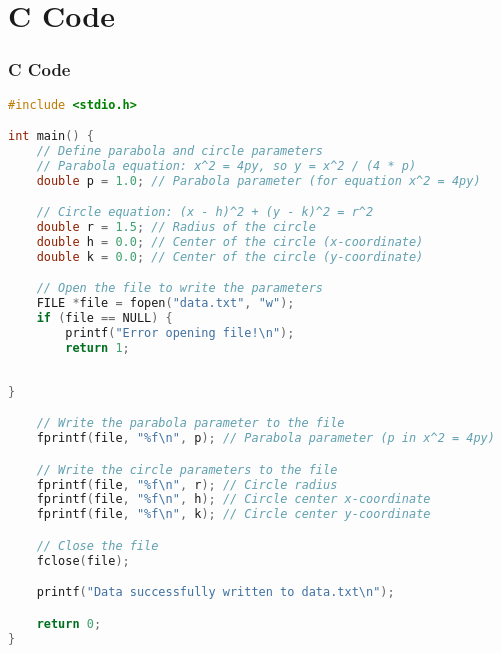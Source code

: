 \documentclass{beamer}
\theoremstyle{remark}
\numberwithin{equation}{section}
\begin{document}
\section{C Code}
\begin{frame}[fragile]
\frametitle{C Code }
\begin{lstlisting}[language=C]
#include <stdio.h>

int main() {
    // Define parabola and circle parameters
    // Parabola equation: x^2 = 4py, so y = x^2 / (4 * p)
    double p = 1.0; // Parabola parameter (for equation x^2 = 4py)

    // Circle equation: (x - h)^2 + (y - k)^2 = r^2
    double r = 1.5; // Radius of the circle
    double h = 0.0; // Center of the circle (x-coordinate)
    double k = 0.0; // Center of the circle (y-coordinate)

    // Open the file to write the parameters
    FILE *file = fopen("data.txt", "w");
    if (file == NULL) {
        printf("Error opening file!\n");
        return 1;
    
\end{lstlisting}
\end{frame}

\begin{frame}[fragile]
\begin{lstlisting}[language=C]
}

    // Write the parabola parameter to the file
    fprintf(file, "%f\n", p); // Parabola parameter (p in x^2 = 4py)

    // Write the circle parameters to the file
    fprintf(file, "%f\n", r); // Circle radius
    fprintf(file, "%f\n", h); // Circle center x-coordinate
    fprintf(file, "%f\n", k); // Circle center y-coordinate

    // Close the file
    fclose(file);

    printf("Data successfully written to data.txt\n");

    return 0;
}
    
\end{lstlisting}
\end{frame}
\end{document}
